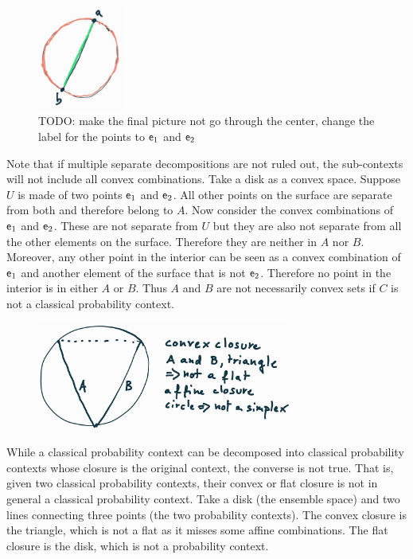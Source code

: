 \begin{mathSection}
\begin{figure}[H]
	\centering
	\includegraphics[width=0.25\textwidth]{tempimages/CounterexampleProbabilityContexts.jpg}
	\caption{TODO: make the final picture not go through the center, change the label for the points to $\mathsf{e}_1$ and $\mathsf{e}_2$}
\end{figure}

\begin{remark}
	Note that if multiple separate decompositions are not ruled out, the sub-contexts will not include all convex combinations. Take a disk as a convex space. Suppose $U$ is made of two points $\mathsf{e}_1$ and $\mathsf{e}_2$. All other points on the surface are separate from both and therefore belong to $A$. Now consider the convex combinations of $\mathsf{e}_1$ and $\mathsf{e}_2$. These are not separate from $U$ but they are also not separate from all the other elements on the surface. Therefore they are neither in $A$ nor $B$. Moreover, any other point in the interior can be seen as a convex combination of $\mathsf{e}_1$ and another element of the surface that is not $\mathsf{e}_2$. Therefore no point in the interior is in either $A$ or $B$. Thus $A$ and $B$ are not necessarily convex sets if $C$ is not a classical probability context.
\end{remark}

\begin{figure}[H]
	\centering
	\includegraphics[width=0.75\textwidth]{tempimages/ContextClosureNotContext.jpg}
\end{figure}

\begin{remark}
	While a classical probability context can be decomposed into classical probability contexts whose closure is the original context, the converse is not true. That is, given two classical probability contexts, their convex or flat closure is not in general a classical probability context. Take a disk (the ensemble space) and two lines connecting three points (the two probability contexts). The convex closure is the triangle, which is not a flat as it misses some affine combinations. The flat closure is the disk, which is not a probability context.
\end{remark}


\end{mathSection}
